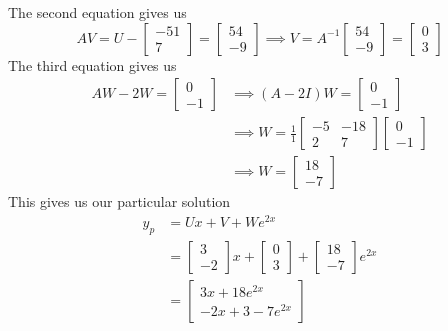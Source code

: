 \documentclass[openany]{report}
\begin{document}
The second equation gives us 
\[AV = U - \begin{bmatrix}
    -51\\7
\end{bmatrix} = \begin{bmatrix}
    54\\-9
\end{bmatrix}\implies V = A^{-1}\begin{bmatrix}
    54\\-9
\end{bmatrix} = \begin{bmatrix}
    0\\3
\end{bmatrix}\]
The third equation gives us 
\begin{align*}
    AW - 2W = \begin{bmatrix}
        0\\-1
    \end{bmatrix} &\implies (A - 2I)W = \begin{bmatrix}
        0\\-1
    \end{bmatrix}\\
    &\implies W = \frac{1}{1}\begin{bmatrix}
        -5 & -18\\
        2 & 7
    \end{bmatrix}\begin{bmatrix}
        0\\-1
    \end{bmatrix}\\
    &\implies W = \begin{bmatrix}
        18\\-7
    \end{bmatrix}        
\end{align*}
This gives us our particular solution
\begin{align*}
    y_p &= Ux + V + We^{2x}\\
    &= \begin{bmatrix}
        3\\-2
    \end{bmatrix}x + \begin{bmatrix}
        0\\3
    \end{bmatrix} + \begin{bmatrix}
        18\\-7
    \end{bmatrix}e^{2x}\\
    &= \begin{bmatrix}
        3x + 18e^{2x}\\
        -2x+3 - 7e^{2x}
    \end{bmatrix}  
\end{align*}
\end{document}

